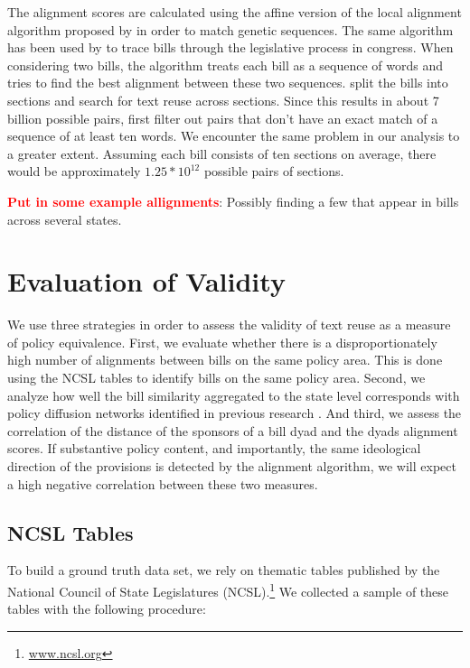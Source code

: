 \documentclass[12pt]{article} %
\begin{document}
The alignment scores are calculated using the affine version of the local alignment algorithm proposed by \citet{smith1981identification} in order to match genetic sequences. The same algorithm has been used by \citet{wilkerson2015tracing} to trace bills through the legislative process in congress. When considering two bills, the algorithm treats each bill as a sequence of words and tries to find the best alignment between these two sequences. \citet{wilkerson2015tracing} split the bills into sections and search for text reuse across sections. Since this results in about 7 billion possible pairs, first filter out pairs that don't have an exact match of a sequence of at least ten words. We encounter the same problem in our analysis to a greater extent. Assuming each bill consists of ten sections on average, there would be approximately $1.25 * 10^{12}$ possible pairs of sections. 

{\bf \textcolor{red}{Put in some example allignments}}: Possibly finding a few that appear in bills across several states.


\section{Evaluation of Validity}

We use three strategies in order to assess the validity of text reuse as a measure of policy equivalence. First, we evaluate whether there is a disproportionately high number of alignments between bills on the same policy area. This is done using the NCSL tables to identify bills on the same policy area.  Second, we analyze how well the bill similarity aggregated to the state level corresponds with policy diffusion networks identified in previous research \citep{desmarais2015}. And third, we assess the correlation of the distance of the sponsors of a bill dyad and the dyads alignment scores. If substantive policy content, and importantly, the same ideological direction of the provisions is detected by the alignment algorithm, we will expect a high negative correlation between these two measures.
\subsection{NCSL Tables}


To build a ground truth data set, we rely on thematic tables published by the National Council of State Legislatures (NCSL).\footnote{\url{www.ncsl.org}}  We collected a sample of these tables with the following procedure:
\end{document}

